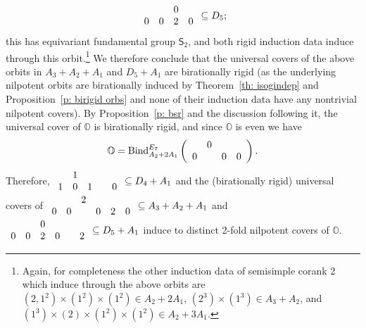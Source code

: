 \documentclass[11pt]{amsart}
\renewcommand{\O}{{\mathbb O}}
\newcommand{\Sym}{{\mathsf{S}}}
\newcommand{\BInd}{{{\mbox{\rm Bind}}}}
\numberwithin{equation}{section}
\begin{document}
	$$\begin{array}{c c c c c}
	&  & 0 &\\
	0 & 0 & 2 & 0 \\
	\end{array}\subseteq D_5;$$ this has equivariant fundamental group $\Sym_2$, and both rigid induction data induce through this orbit.\footnote{Again, for completeness the other induction data of semisimple corank 2 which induce through the above orbits are $(2,1^2)\times (1^2)\times (1^2)\in A_2+2A_1$, $(2^3)\times (1^3)\in A_3+A_2$, and $(1^3)\times (2)\times (1^2)\times (1^2)\in A_2+3A_1$.} We therefore conclude that the universal covers of the above orbits in $A_3+A_2+A_1$ and $D_5+A_1$ are birationally rigid (as the underlying nilpotent orbits are birationally induced by Theorem~\ref{th: isogindep} and Proposition~\ref{p: birigid orbs} and none of their induction data have any nontrivial nilpotent covers). By Proposition~\ref{p: bsr} and the discussion following it, the universal cover of $\O$ is birationally rigid, and since $\O$ is even we have $$\O=\BInd_{A_2 + 2 A_1}^{E_7}\left(\begin{array}{c c c c c}
		& 0&  & \\
		0 & & 0 & 0   \\
	\end{array}\right).$$ Therefore, $\begin{array}{c c c c c c}
		& 1 & & & \\
		1 & 0 & 1 &  & 0 \\
	\end{array}\subseteq D_4 + A_1$ and the (birationally rigid) universal covers  of  $\begin{array}{c c c c c c c}
	& & 2 & & &\\
	0 & 0 &  & 0 & 2 & 0   \\
	\end{array} \subseteq A_3+A_2 + A_1$  and  $\begin{array}{c c c c c c}
		& & 0 & & &\\
		0 & 0 & 2 &  0 & & 2   \\
	\end{array} \subseteq D_5 + A_1$ induce to distinct 2-fold nilpotent covers of $\O$. 
	
\end{document}

